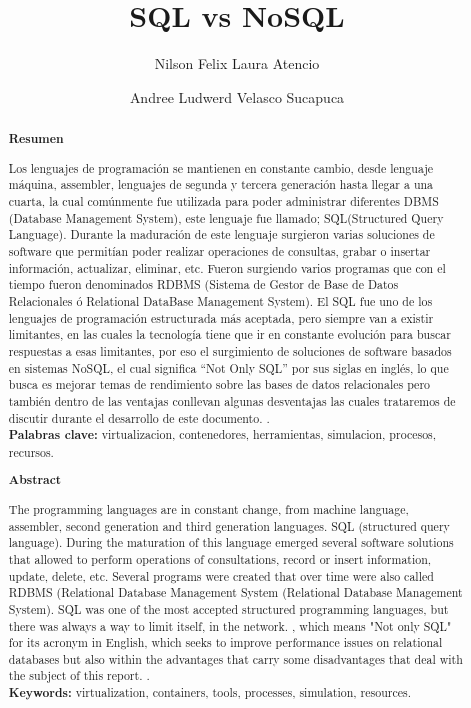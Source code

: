 \documentclass[%
 reprint,
 amsmath,amssymb,
 aps,
]{revtex4-1}
\begin{document}
\title{SQL vs NoSQL}
\author{Nilson Felix Laura Atencio}
\author{Andree Ludwerd Velasco Sucapuca}

%


\begin{abstract}
\begin{center}
\textbf{Resumen}
\end{center}

Los lenguajes de programación se mantienen en constante cambio, desde lenguaje máquina, assembler, lenguajes de segunda y tercera generación hasta llegar a una cuarta, la cual comúnmente fue utilizada para poder administrar diferentes DBMS (Database Management System), este lenguaje fue llamado; SQL(Structured Query Language). Durante la maduración de este lenguaje surgieron varias soluciones de software que permitían poder realizar operaciones de consultas, grabar o insertar información, actualizar, eliminar, etc. Fueron surgiendo varios programas que con el tiempo fueron denominados RDBMS (Sistema de Gestor de Base de Datos Relacionales ó Relational DataBase Management System).
El SQL fue uno de los lenguajes de programación estructurada más aceptada, pero siempre van a existir limitantes, en las cuales la tecnología tiene que ir en constante evolución para buscar respuestas a esas limitantes, por eso el surgimiento de soluciones de software basados en sistemas NoSQL, el cual significa “Not Only SQL” por sus siglas en inglés, lo que busca es mejorar temas de rendimiento sobre las bases de datos relacionales pero también dentro de las ventajas conllevan algunas desventajas las cuales trataremos de discutir durante el desarrollo de este documento.
.\\

\textbf{Palabras clave:}   virtualizacion, contenedores, herramientas, simulacion, procesos, recursos.\\

\begin{center}
\textbf{Abstract}
\end{center}
The programming languages are in constant change, from machine language, assembler, second generation and third generation languages. SQL (structured query language). During the maturation of this language emerged several software solutions that allowed to perform operations of consultations, record or insert information, update, delete, etc. Several programs were created that over time were also called RDBMS (Relational Database Management System (Relational Database Management System). SQL was one of the most accepted structured programming languages, but there was always a way to limit itself, in the network. , which means "Not only SQL" for its acronym in English, which seeks to improve performance issues on relational databases but also within the advantages that carry some disadvantages that deal with the subject of this report. .\\
\textbf{Keywords:}   virtualization, containers, tools, processes, simulation, resources.\\


\end{abstract}
\end{document}
